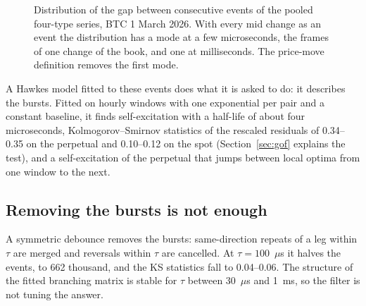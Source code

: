 \documentclass[a4paper,11pt]{article}
\begin{document}
\begin{figure}[htbp]
\centering
{}
\caption{Distribution of the gap between consecutive events of the pooled four-type series, BTC 1 March 2026. With every mid change as an event the distribution has a mode at a few microseconds, the frames of one change of the book, and one at milliseconds. The price-move definition removes the first mode.}
\label{fig:gaps}
\end{figure}

A Hawkes model fitted to these events does what it is asked to do: it describes the bursts. Fitted on hourly windows with one exponential per pair and a constant baseline, it finds self-excitation with a half-life of about four microseconds, Kolmogorov--Smirnov statistics of the rescaled residuals of 0.34--0.35 on the perpetual and 0.10--0.12 on the spot (Section~\ref{sec:gof} explains the test), and a self-excitation of the perpetual that jumps between local optima from one window to the next.

\subsection{Removing the bursts is not enough}

A symmetric debounce removes the bursts: same-direction repeats of a leg within $\tau$ are merged and reversals within $\tau$ are cancelled. At $\tau = 100$~$\mu$s it halves the events, to 662 thousand, and the KS statistics fall to 0.04--0.06. The structure of the fitted branching matrix is stable for $\tau$ between 30~$\mu$s and 1~ms, so the filter is not tuning the answer.
\end{document}
